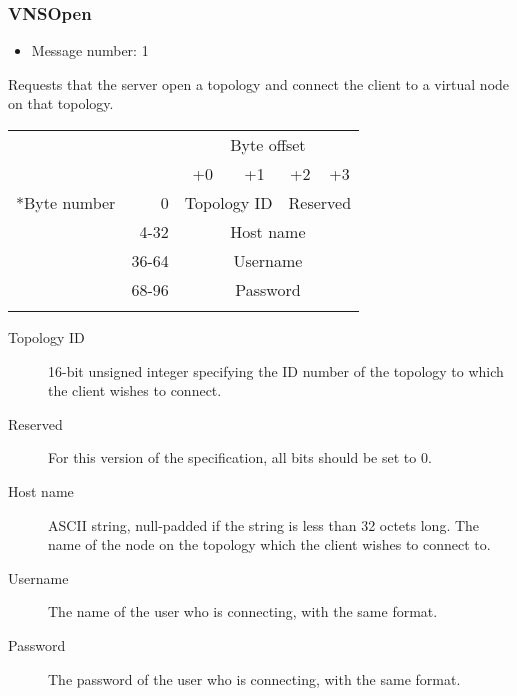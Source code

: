 \documentclass[a4paper,12pt]{report}
\begin{document}
\subsubsection{VNSOpen}
\begin{itemize}
\item Message number: 1
\end{itemize}
Requests that the server open a topology and connect the client to a virtual node on that topology.
\begin{center}
\begin{tabular}{r r | c | c | c | c |}
 & & \multicolumn{4}{c}{Byte offset} \\
 & & +0 & +1 & +2 & +3 \\
\hhline{~-----}
\multirow{4}*{Byte number} & 0 & \multicolumn{2}{c|}{Topology ID} & \multicolumn{2}{c|}{Reserved} \\
\hhline{~~----}
 & 4-32 & \multicolumn{4}{c}{Host name} \\
\hhline{~~----}
 & 36-64 & \multicolumn{4}{c}{Username} \\
\hhline{~~----}
 & 68-96 & \multicolumn{4}{c}{Password} \\
\hhline{~~----}
\end{tabular}
\end{center}
\begin{description}
\item[Topology ID]  16-bit unsigned integer specifying the ID number of the topology to which the client wishes to connect.
\item[Reserved]  For this version of the specification, all bits should be set to 0.
\item[Host name]  ASCII string, null-padded if the string is less than 32 octets long.  The name of the node on the topology which the client wishes to connect to.
\item[Username]  The name of the user who is connecting, with the same format.
\item[Password]  The password of the user who is connecting, with the same format.
\end{description}
\end{document}
